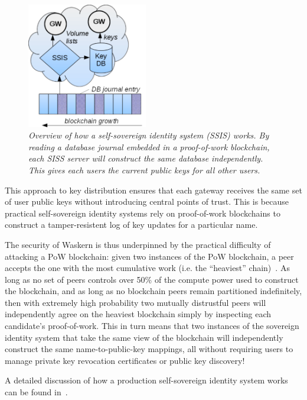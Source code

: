 \begin{figure}[t!]
\centering
\includegraphics[width=0.47\textwidth]{figures/blockstack-overview}
\caption{\it
   Overview of how a self-sovereign identity system (SSIS) works.  By reading a
   database journal embedded in a proof-of-work blockchain, each SISS server
   will construct the same database independently.  This gives each
   users the current public keys for all other users.
   }
\label{fig:cert-graph}
\end{figure}

This approach to key distribution ensures that each gateway receives the same
set of user public keys without introducing central points of trust. This is
because practical self-sovereign identity systems rely on proof-of-work
blockchains to construct a tamper-resistent log of key updates for a particular
name.

The security of Waskern is thus underpinned by the practical difficulty of attacking a
PoW blockchain: given two instances of the PoW blockchain,
a peer accepts the one with the most cumulative work (i.e. the
``heaviest'' chain)~\cite{bitcoin-textbook}. As long as no set of peers controls over 50\% of the
compute power used to construct the blockchain, and as long as no blockchain
peers remain partitioned indefinitely, then with extremely high probability two
mutually distrustful peers will independently agree on the heaviest blockchain
simply by inspecting each candidate's proof-of-work.  This in turn means
that two instances of the sovereign identity system that take the same view of
the blockchain will independently construct the same name-to-public-key
mappings, all without requiring users to manage private key revocation
certificates or public key discovery!

A detailed discussion of how a production self-sovereign identity system
works can be found in~\cite{blockstack}.

